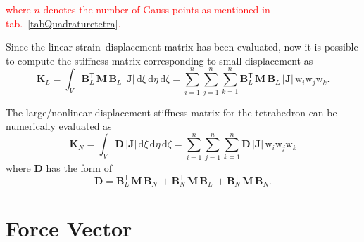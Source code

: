 \textcolor{red}{where $n$ denotes the number of Gauss points as mentioned in  tab.~\ref{tabQuadraturetetra}.}

Since the linear strain--displacement matrix has been evaluated, now it is possible to compute the  stiffness matrix corresponding to small displacement as 
\begin{equation}
\mathbf{K}_{L} = \int_{V} \mathbf{B}_L^{\mathsf{T}} \, \mathbf{M} \, \mathbf{B}_L \, |\mathbf{J}| \,  \mathrm{d} \xi \,  \mathrm{d} \eta \,  \mathrm{d} \zeta =  \sum_{i=1}^{n}  \sum_{j=1}^{n}  \sum_{k=1}^{n}  \mathbf{B}_L^{\mathsf{T}} \, \mathbf{M} \, \mathbf{B}_L \, |\mathbf{J}|  \, \mathrm{w}_i \mathrm{w}_j \mathrm{w}_k.
\end{equation}

The large/nonlinear displacement stiffness matrix for the tetrahedron can be numerically evaluated as
\begin{equation}
\mathbf{K}_{N} = \int_{V} \mathbf{D} \, |\mathbf{J}|\, \mathrm{d} \xi \, \mathrm{d} \eta \, \mathrm{d} \zeta
= \sum_{i=1}^{n}  \sum_{j=1}^{n}  \sum_{k=1}^{n}  \mathbf{D} \, |\mathbf{J}| \, \mathrm{w}_i \mathrm{w}_j \mathrm{w}_k
\end{equation}
where $\mathbf{D}$ has the form of 
\begin{equation}
\mathbf{D} = \mathbf{B}_L^{\mathsf{T}} \, \mathbf{M} \, \mathbf{B}_N \, + \mathbf{B}_N^{\mathsf{T}} \, \mathbf{M} \, \mathbf{B}_L \, + \mathbf{B}_N^{\mathsf{T}} \, \mathbf{M} \, \mathbf{B}_N.
\end{equation}

\section{Force Vector}


